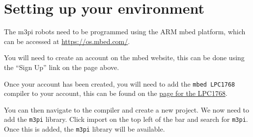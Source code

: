 \section{Setting up your environment}\label{setting-up-your-environment}

The m3pi robots need to be programmed using the ARM mbed platform, which
can be accessed at \url{https://os.mbed.com/}.

You will need to create an account on the mbed website, this can be done
using the ``Sign Up'' link on the page above.

Once your account has been created, you will need to add the
\lstinline!mbed LPC1768! compiler to your account, this can be found on
the \href{https://os.mbed.com/platforms/mbed-LPC1768/}{page for the
LPC1768}.

You can then navigate to the compiler and create a new project. We now
need to add the \lstinline!m3pi! library. Click import on the top left
of the bar and search for \lstinline!m3pi!. Once this is added, the
\lstinline!m3pi! library will be available.
